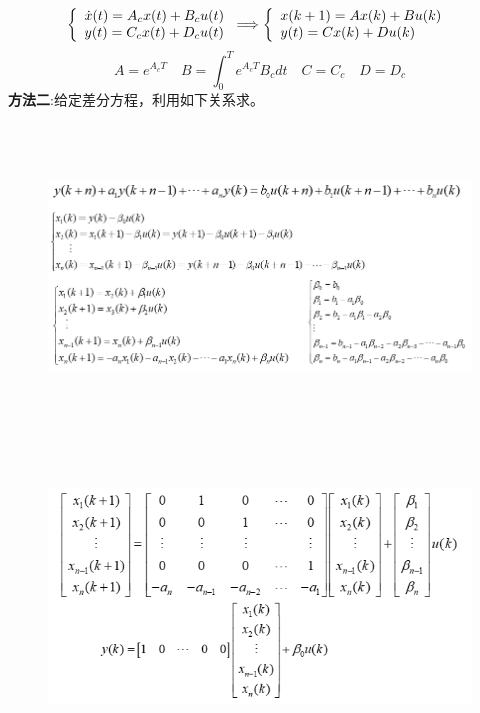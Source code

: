 \documentclass[12pt, a4paper, oneside]{ctexbook}
\begin{document}
$$
\left\{  
\begin{array}{lr}  
	\dot{x}(t)=A_cx(t)+B_cu(t)\\
	y(t)=C_cx(t)+D_cu(t)\\   
\end{array}      
\right.  
\Longrightarrow
\left\{  
\begin{array}{lr}  
	x(k+1)=Ax(k)+Bu(k)\\
	y(t)=Cx(k)+Du(k)\\  
\end{array}      
\right. \\
$$
$$
A=e^{A_cT}\quad B=\int_0^Te^{A_cT}B_cdt\quad C=C_c\quad D=D_c
$$
\textbf{方法二}:给定差分方程，利用如下关系求。
\begin{figure}[htbp]
	\centering
	\includegraphics[width=16cm,height=8cm]{img/10_1.png}
\end{figure}
\begin{figure}[htbp]
	\centering
	\includegraphics[width=16cm,height=8cm]{img/10_2.png}
\end{figure}
\newpage 
\end{document}
